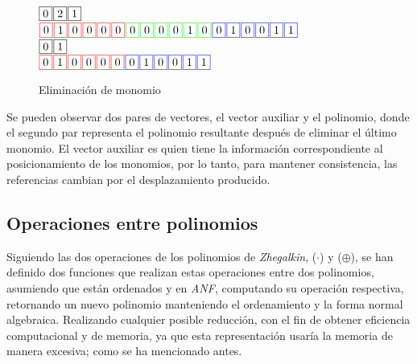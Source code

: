 \begin{figure}
    \centering
    \begin{minipage}[c][3.5cm][b]{.65\textwidth}
    \noindent
    $\fbox{0} \hspace*{.1em} \fbox{2} \hspace*{.1em} \fbox{1}$\ \\
    \noindent
    $\fcolorbox{red}{white}{0} \sep \fcolorbox{red}{white}{1} \sep \fcolorbox{red}{white}{0} \sep \fcolorbox{red}{white}{0} \sep \fcolorbox{red}{white}{0} \sep \fcolorbox{red}{white}{0} \sep \fcolorbox{green}{white}{0} \sep \fcolorbox{green}{white}{0} \sep \fcolorbox{green}{white}{0} \sep \fcolorbox{green}{white}{0} \sep \fcolorbox{green}{white}{1} \sep \fcolorbox{green}{white}{0} \sep \fcolorbox{blue}{white}{0} \sep \fcolorbox{blue}{white}{1} \sep \fcolorbox{blue}{white}{0} \sep \fcolorbox{blue}{white}{0} \sep \fcolorbox{blue}{white}{1} \sep \fcolorbox{blue}{white}{1}$\ \\
    \noindent
    $\fbox{0} \hspace*{.1em} \fbox{1}$\ \\
    \noindent
    $\fcolorbox{red}{white}{0} \sep \fcolorbox{red}{white}{1} \sep \fcolorbox{red}{white}{0} \sep \fcolorbox{red}{white}{0} \sep \fcolorbox{red}{white}{0} \sep \fcolorbox{red}{white}{0} \sep \fcolorbox{blue}{white}{0} \sep \fcolorbox{blue}{white}{1} \sep \fcolorbox{blue}{white}{0} \sep \fcolorbox{blue}{white}{0} \sep \fcolorbox{blue}{white}{1} \sep \fcolorbox{blue}{white}{1}$
    \end{minipage}
\caption{Eliminación de monomio}
\label{fig:p_e}
\end{figure}

Se pueden observar dos pares de vectores, el vector auxiliar y el polinomio, donde el segundo par representa el polinomio resultante después de eliminar el último monomio. El vector auxiliar es quien tiene la información correspondiente al posicionamiento de los monomios, por lo tanto, para mantener consistencia, las referencias cambian por el desplazamiento producido.

\subsection{Operaciones entre polinomios}

Siguiendo las dos operaciones de los polinomios de \textit{Zhegalkin}, ($\cdot$) y ($\oplus$), se han definido dos funciones que realizan estas operaciones entre dos polinomios, asumiendo que están ordenados y en \textit{ANF}, computando su operación respectiva, retornando un nuevo polinomio manteniendo el ordenamiento y la forma normal algebraica. Realizando cualquier posible reducción, con el fin de obtener eficiencia computacional y de memoria, ya que esta representación usaría la memoria de manera excesiva; como se ha mencionado antes.

